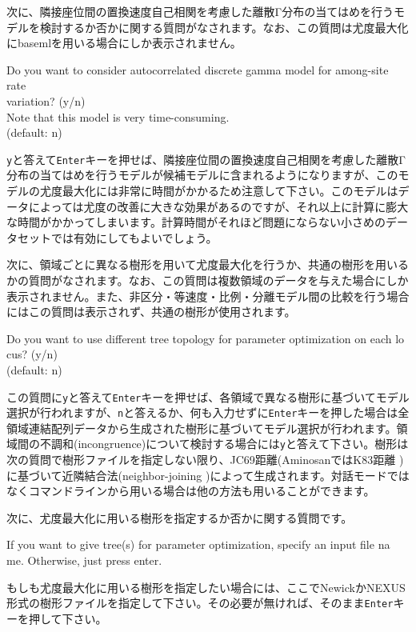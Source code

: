 \documentclass[titlepage,10pt,a4paper]{jsbook}
\newenvironment{cmd}{\begin{oframed}\raggedright\ttfamily\footnotesize\setlength{\baselineskip}{1.4em}}{\end{oframed}\vspace{-1em}}
\begin{document}
次に、隣接座位間の置換速度自己相関を考慮した離散Γ分布の当てはめを行うモデルを検討するか否かに関する質問がなされます。なお、この質問は尤度最大化にbasemlを用いる場合にしか表示されません。
\begin{cmd}
Do you want to consider autocorrelated discrete gamma model for among-site rate\\
variation? (y/n)\\
Note that this model is very time-consuming.\\
(default: n)
\end{cmd}
\texttt{y}と答えて\texttt{Enter}キーを押せば、隣接座位間の置換速度自己相関を考慮した離散Γ分布の当てはめを行うモデルが候補モデルに含まれるようになりますが、このモデルの尤度最大化には非常に時間がかかるため注意して下さい。このモデルはデータによっては尤度の改善に大きな効果があるのですが、それ以上に計算に膨大な時間がかかってしまいます。計算時間がそれほど問題にならない小さめのデータセットでは有効にしてもよいでしょう。

次に、領域ごとに異なる樹形を用いて尤度最大化を行うか、共通の樹形を用いるかの質問がなされます。なお、この質問は複数領域のデータを与えた場合にしか表示されません。また、非区分・等速度・比例・分離モデル間の比較を行う場合にはこの質問は表示されず、共通の樹形が使用されます。
\begin{cmd}
Do you want to use different tree topology for parameter optimization on each lo\\
cus? (y/n)\\
(default: n)
\end{cmd}
この質問に\texttt{y}と答えて\texttt{Enter}キーを押せば、各領域で異なる樹形に基づいてモデル選択が行われますが、\texttt{n}と答えるか、何も入力せずに\texttt{Enter}キーを押した場合は全領域連結配列データから生成された樹形に基づいてモデル選択が行われます。領域間の不調和(incongruence)について検討する場合には\texttt{y}と答えて下さい。樹形は次の質問で樹形ファイルを指定しない限り、JC69距離(AminosanではK83距離 \citep{Kimura1983})に基づいて近隣結合法(neighbor-joining \citep{Saitou1987})によって生成されます。対話モードではなくコマンドラインから用いる場合は他の方法も用いることができます。

次に、尤度最大化に用いる樹形を指定するか否かに関する質問です。
\begin{cmd}
If you want to give tree(s) for parameter optimization, specify an input file na\\
me.
Otherwise, just press enter.
\end{cmd}
もしも尤度最大化に用いる樹形を指定したい場合には、ここでNewickかNEXUS形式の樹形ファイルを指定して下さい。その必要が無ければ、そのまま\texttt{Enter}キーを押して下さい。
\end{document}
